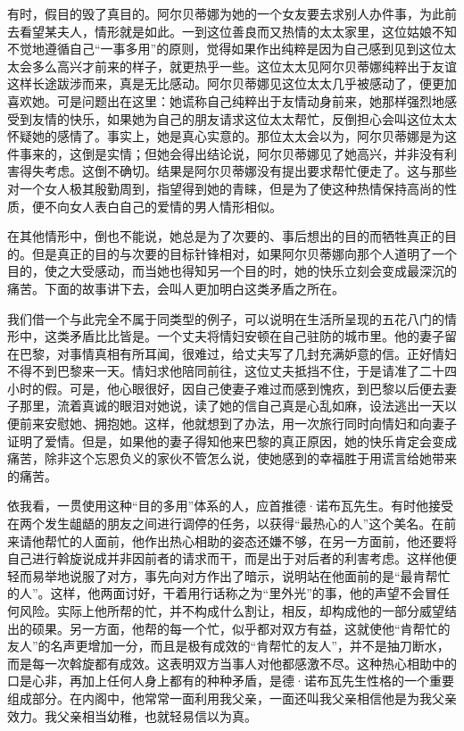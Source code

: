 \par 有时，假目的毁了真目的。阿尔贝蒂娜为她的一个女友要去求别人办件事，为此前去看望某夫人，情形就是如此。一到这位善良而又热情的太太家里，这位姑娘不知不觉地遵循自己“一事多用”的原则，觉得如果作出纯粹是因为自己感到见到这位太太会多么高兴才前来的样子，就更热乎一些。这位太太见阿尔贝蒂娜纯粹出于友谊这样长途跋涉而来，真是无比感动。阿尔贝蒂娜见这位太太几乎被感动了，便更加喜欢她。可是问题出在这里：她谎称自己纯粹出于友情动身前来，她那样强烈地感受到友情的快乐，如果她为自己的朋友请求这位太太帮忙，反倒担心会叫这位太太怀疑她的感情了。事实上，她是真心实意的。那位太太会以为，阿尔贝蒂娜是为这件事来的，这倒是实情；但她会得出结论说，阿尔贝蒂娜见了她高兴，并非没有利害得失考虑。这倒不确切。结果是阿尔贝蒂娜没有提出要求帮忙便走了。这与那些对一个女人极其殷勤周到，指望得到她的青睐，但是为了使这种热情保持高尚的性质，便不向女人表白自己的爱情的男人情形相似。
\par 在其他情形中，倒也不能说，她总是为了次要的、事后想出的目的而牺牲真正的目的。但是真正的目的与次要的目标针锋相对，如果阿尔贝蒂娜向那个人道明了一个目的，使之大受感动，而当她也得知另一个目的时，她的快乐立刻会变成最深沉的痛苦。下面的故事讲下去，会叫人更加明白这类矛盾之所在。
\par 我们借一个与此完全不属于同类型的例子，可以说明在生活所呈现的五花八门的情形中，这类矛盾比比皆是。一个丈夫将情妇安顿在自己驻防的城市里。他的妻子留在巴黎，对事情真相有所耳闻，很难过，给丈夫写了几封充满妒意的信。正好情妇不得不到巴黎来一天。情妇求他陪同前往，这位丈夫抵挡不住，于是请准了二十四小时的假。可是，他心眼很好，因自己使妻子难过而感到愧疚，到巴黎以后便去妻子那里，流着真诚的眼泪对她说，读了她的信自己真是心乱如麻，设法逃出一天以便前来安慰她、拥抱她。这样，他就想到了办法，用一次旅行同时向情妇和向妻子证明了爱情。但是，如果他的妻子得知他来巴黎的真正原因，她的快乐肯定会变成痛苦，除非这个忘恩负义的家伙不管怎么说，使她感到的幸福胜于用谎言给她带来的痛苦。
\par 依我看，一贯使用这种“目的多用”体系的人，应首推德·诺布瓦先生。有时他接受在两个发生龃龉的朋友之间进行调停的任务，以获得“最热心的人”这个美名。在前来请他帮忙的人面前，他作出热心相助的姿态还嫌不够，在另一方面前，他还要将自己进行斡旋说成并非因前者的请求而干，而是出于对后者的利害考虑。这样他便轻而易举地说服了对方，事先向对方作出了暗示，说明站在他面前的是“最肯帮忙的人”。这样，他两面讨好，干着用行话称之为“里外光”的事，他的声望不会冒任何风险。实际上他所帮的忙，并不构成什么割让，相反，却构成他的一部分威望结出的硕果。另一方面，他帮的每一个忙，似乎都对双方有益，这就使他“肯帮忙的友人”的名声更增加一分，而且是极有成效的“肯帮忙的友人”，并不是抽刀断水，而是每一次斡旋都有成效。这表明双方当事人对他都感激不尽。这种热心相助中的口是心非，再加上任何人身上都有的种种矛盾，是德·诺布瓦先生性格的一个重要组成部分。在内阁中，他常常一面利用我父亲，一面还叫我父亲相信他是为我父亲效力。我父亲相当幼稚，也就轻易信以为真。
